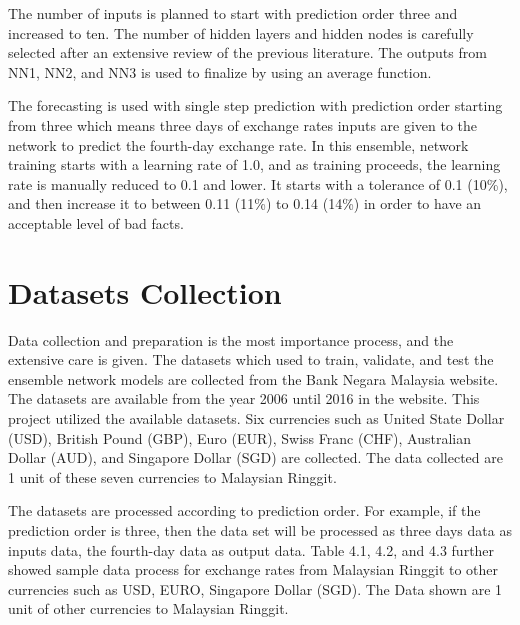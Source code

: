 The number of inputs is planned to start with prediction order three and increased to ten. The number of hidden layers and hidden nodes is carefully selected  after an extensive review of the previous literature. The outputs from NN1, NN2, and NN3 is used to finalize by using an average function. 

The forecasting is used with  single step prediction with prediction order starting from three which means three days of exchange rates inputs are given to the network to predict the fourth-day exchange rate. In this ensemble, network training starts with a learning rate of 1.0, and as training proceeds, the learning rate is manually reduced to 0.1 and lower. It starts with a tolerance of 0.1 (10\%), and then increase it to between 0.11 (11\%) to 0.14 (14\%) in order to have an acceptable level of bad facts.

\section{Datasets Collection}
Data collection and preparation is the most importance process, and the extensive care is given. The datasets which used to train, validate, and test the ensemble network models are collected from the Bank Negara Malaysia website. The datasets are available from the year 2006 until 2016 in the website. This project utilized the available datasets. Six currencies  such as United State Dollar (USD), British Pound (GBP), Euro (EUR), Swiss Franc (CHF), Australian Dollar (AUD), and Singapore Dollar (SGD) are collected. The data collected are 1 unit of these seven currencies to Malaysian Ringgit.
 
The datasets are processed according to prediction order. For example, if the prediction order is three, then the data set will be processed as three days data as inputs data, the fourth-day data as output data. Table 4.1, 4.2, and 4.3  further showed sample data process for exchange rates from Malaysian Ringgit to other currencies such as USD, EURO, Singapore Dollar (SGD). The Data shown are 1 unit of other currencies to Malaysian Ringgit.

